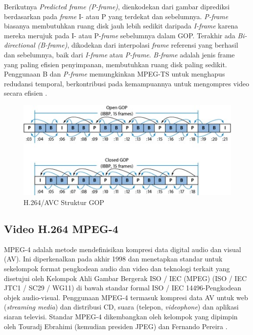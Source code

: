 Berikutnya\textit{ Predicted frame (P-frame)}, dienkodekan dari gambar diprediksi berdasarkan pada \textit{frame} I- atau P yang terdekat dan sebelumnya. \textit{P-frame} biasanya membutuhkan ruang disk jauh lebih sedikit daripada \textit{I-frame} karena mereka merujuk pada I- atau P-\textit{frame} sebelumnya dalam GOP. Terakhir ada \textit{Bi-directional (B-frame)}, dikodekan dari interpolasi \textit{frame} referensi yang berhasil dan sebelumnya, baik dari \textit{I-frame} atau \textit{P-frame}. \textit{B-frame} adalah jenis frame yang paling efisien penyimpanan, membutuhkan ruang disk paling sedikit. Penggunaan B dan \textit{P-frame} memungkinkan MPEG-TS untuk menghapus redudansi temporal, berkontribusi pada kemampuannya untuk mengompres video secara efisien \citep{Inc.2012}.

\begin{figure}[H]
	\vspace{-0.1cm}
	\begin{center}
		\includegraphics[width=0.9\columnwidth]{bab2/Gambar/H.264 AVC Struktur GOP.jpg}
	\end{center}
	\vspace{-0.2cm}
	\caption{H.264/AVC Struktur GOP \citep{Inc.2012}}\label{H.264/AVC Struktur GOP}
\end{figure}


\subsection{Video H.264 MPEG-4}
\hspace{1,2cm}MPEG-4 adalah metode mendefinisikan kompresi data digital audio dan visual (AV). Ini diperkenalkan pada akhir 1998 dan menetapkan standar untuk sekelompok format pengkodean audio dan video dan teknologi terkait yang disetujui oleh Kelompok Ahli Gambar Bergerak ISO / IEC (MPEG) (ISO / IEC JTC1 / SC29 / WG11) di bawah standar formal ISO / IEC 14496-Pengkodean objek audio-visual. Penggunaan MPEG-4 termasuk kompresi data AV untuk web (\textit{streaming media}) dan distribusi CD, suara (telepon, \textit{videophone}) dan aplikasi siaran televisi. Standar MPEG-4 dikembangkan oleh kelompok yang dipimpin oleh Touradj Ebrahimi (kemudian presiden JPEG) dan Fernando Pereira \citep{Ebrahimi2002}.

